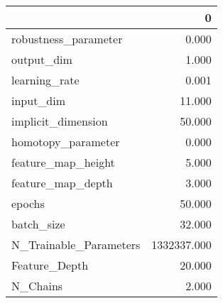 \begin{tabular}{lr}
\toprule
{} &            0 \\
\midrule
robustness\_parameter   &        0.000 \\
output\_dim             &        1.000 \\
learning\_rate          &        0.001 \\
input\_dim              &       11.000 \\
implicit\_dimension     &       50.000 \\
homotopy\_parameter     &        0.000 \\
feature\_map\_height     &        5.000 \\
feature\_map\_depth      &        3.000 \\
epochs                 &       50.000 \\
batch\_size             &       32.000 \\
N\_Trainable\_Parameters &  1332337.000 \\
Feature\_Depth          &       20.000 \\
N\_Chains               &        2.000 \\
\bottomrule
\end{tabular}
